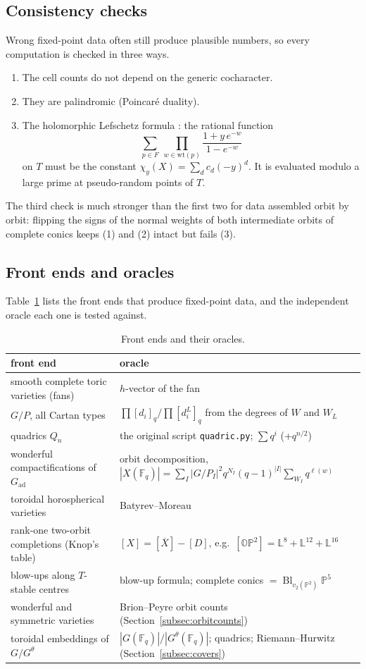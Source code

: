 \documentclass[11pt]{amsart}
\theoremstyle{definition}
\theoremstyle{remark}
\newcommand{\code}[1]{\texttt{#1}}
\newcommand{\PP}{\mathbb{P}}
\newcommand{\LL}{\mathbb{L}}
\newcommand{\wt}{\mathrm{wt}}
\DeclareMathOperator{\Bl}{Bl}
\begin{document}
\subsection{Consistency checks}\label{subsec:checks}
Wrong fixed-point data often still produce plausible numbers, so every
computation is checked in three ways.
\begin{enumerate}
\item The cell counts do not depend on the generic cocharacter.
\item They are palindromic (Poincar\'e duality).
\item The holomorphic Lefschetz formula \cite{AtiyahBottLefschetz}: the
rational function
\[
\sum_{p\in F}\ \prod_{w\in\wt(p)} \frac{1+y\,e^{-w}}{1-e^{-w}}
\]
on $T$ must be the constant $\chi_y(X) = \sum_d c_d(-y)^d$. It is evaluated
modulo a large prime at pseudo-random points of $T$.
\end{enumerate}
The third check is much stronger than the first two for data assembled
orbit by orbit: flipping the signs of the normal weights of both
intermediate orbits of complete conics keeps (1) and (2) intact but fails
(3).

\subsection{Front ends and oracles}\label{subsec:frontends}
Table~\ref{tab:frontends} lists the front ends that produce fixed-point
data, and the independent oracle each one is tested against.

\begin{table}[ht]
\caption{Front ends and their oracles.}\label{tab:frontends}
\begin{tabular}{p{}p{}}
\toprule
front end & oracle \\
\midrule
smooth complete toric varieties (fans) & $h$-vector of the fan \\
$G/P$, all Cartan types & $\prod[d_i]_q/\prod[d_i^L]_q$ from the degrees of $W$ and $W_L$ \\
quadrics $Q_n$ & the original script \code{quadric.py}; $\sum q^i$ (+$q^{n/2}$) \\
wonderful compactifications of $G_{\mathrm{ad}}$ & orbit decomposition, $|X(\mathbb F_q)|=\sum_I |G/P_I|^2 q^{N_I}(q-1)^{|I|}\sum_{W_I}q^{\ell(w)}$ \\
toroidal horospherical varieties & Batyrev--Moreau \cite{BatyrevMoreau} \\
rank-one two-orbit completions (Knop's table) & $[X]=[\overline X]-[D]$, e.g.\ $[\mathbb{OP}^2]=\LL^8+\LL^{12}+\LL^{16}$ \\
blow-ups along $T$-stable centres & blow-up formula; complete conics $=\Bl_{v_2(\PP^2)}\PP^5$ \\
wonderful and symmetric varieties & Brion--Peyre orbit counts (Section~\ref{subsec:orbitcounts}) \\
toroidal embeddings of $G/G^\theta$ & $|G(\mathbb F_q)|/|G^\theta(\mathbb F_q)|$; quadrics; Riemann--Hurwitz (Section~\ref{subsec:covers}) \\
\bottomrule
\end{tabular}
\end{table}
\end{document}
